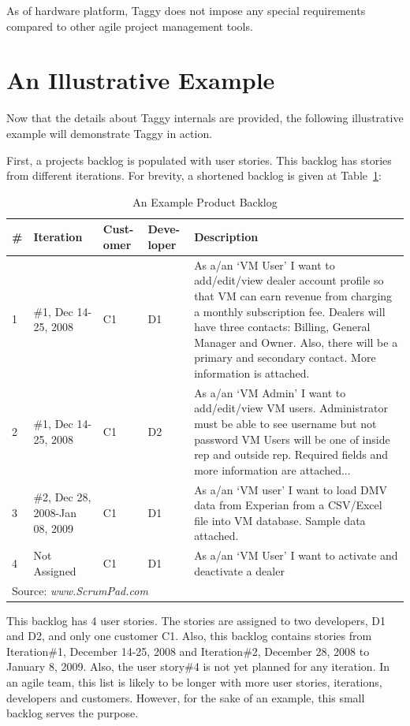 As of hardware platform, Taggy does not impose any special requirements compared to other agile project management tools.

\section{An Illustrative Example}	
Now that the details about Taggy internals are provided, the following illustrative example will demonstrate Taggy in action.

First, a projects backlog is populated with user stories. This backlog has stories from different iterations. For brevity, a shortened backlog is given at Table~\ref{tab:backlog}:

\begin{table}
  \centering
  \caption{An Example Product Backlog}
    \begin{tabular}{|p{0.5cm}|p{1.7cm}|p{1.2cm}|p{1.2cm}|p{7cm}|}
      \hline
      \textbf{\#} & \textbf{Iteration} & \textbf{Cust- omer} & \textbf{Deve- loper} & \textbf{Description}\\
      \hline
		1 & \#1, Dec 14-25, 2008 & C1 & D1 & As a/an `VM User' I want to add/edit/view dealer account profile so that VM can earn revenue from charging a monthly subscription fee.
			Dealers will have three contacts: Billing, General Manager and Owner. Also, there will be a primary and secondary contact. More information is attached.\\
      \hline
		2 & \#1, Dec 14-25, 2008 & C1 & D2 & As a/an `VM Admin' I want to add/edit/view VM users. 
		Administrator must be able to see username but not password VM Users will be one of inside rep and outside rep. 
		Required fields and more information are attached...\\
	  \hline
		3 & \#2, Dec 28, 2008-Jan 08, 2009 & C1 & D1 & As a/an `VM user' I want to load DMV data from Experian from a CSV/Excel file into VM database. Sample data attached.\\
	  \hline
		4 & Not Assigned & C1 & D1 & As a/an `VM User' I want to activate and deactivate a dealer\\
	  \hline
      \multicolumn{4}{l}{Source: \emph{www.ScrumPad.com}}
    \end{tabular}
		\label{tab:backlog}
\end{table}

This backlog has 4 user stories. The stories are assigned to two developers, D1 and D2, and only one customer C1. Also, this backlog contains stories from Iteration\#1, December 14-25, 2008 and Iteration\#2, December 28, 2008 to January 8, 2009. Also, the user story\#4 is not yet planned for any iteration. In an agile team, this list is likely to be longer with more user stories, iterations, developers and customers. However, for the sake of an example, this small backlog serves the purpose.

